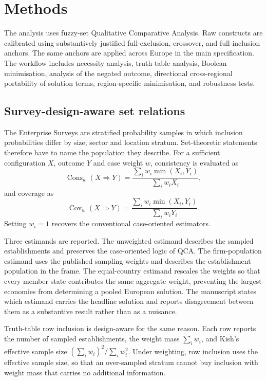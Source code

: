 \section{Methods}

The analysis uses fuzzy-set Qualitative Comparative Analysis. Raw constructs are
calibrated using substantively justified full-exclusion, crossover, and
full-inclusion anchors. The same anchors are applied across Europe in the main
specification. The workflow includes necessity analysis, truth-table analysis,
Boolean minimisation, analysis of the negated outcome, directional cross-regional
portability of solution terms, region-specific minimisation, and robustness tests.

\subsection{Survey-design-aware set relations}

The Enterprise Surveys are stratified probability samples in which inclusion
probabilities differ by size, sector and location stratum. Set-theoretic
statements therefore have to name the population they describe. For a sufficient
configuration $X$, outcome $Y$ and case weight $w$, consistency is evaluated as
\[
\operatorname{Cons}_w(X \Rightarrow Y)=
\frac{\sum_i w_i \min(X_i,Y_i)}{\sum_i w_i X_i},
\]
and coverage as
\[
\operatorname{Cov}_w(X \Rightarrow Y)=
\frac{\sum_i w_i \min(X_i,Y_i)}{\sum_i w_i Y_i}.
\]
Setting $w_i = 1$ recovers the conventional case-oriented estimators.

Three estimands are reported. The unweighted estimand describes the sampled
establishments and preserves the case-oriented logic of QCA. The
firm-population estimand uses the published sampling weights and describes the
establishment population in the frame. The equal-country estimand rescales the
weights so that every member state contributes the same aggregate weight,
preventing the largest economies from determining a pooled European solution.
The manuscript states which estimand carries the headline solution and reports
disagreement between them as a substantive result rather than as a nuisance.

Truth-table row inclusion is design-aware for the same reason. Each row reports
the number of sampled establishments, the weight mass $\sum_i w_i$, and Kish's
effective sample size $(\sum_i w_i)^2 / \sum_i w_i^2$. Under weighting, row
inclusion uses the effective sample size, so that an over-sampled stratum cannot
buy inclusion with weight mass that carries no additional information.

